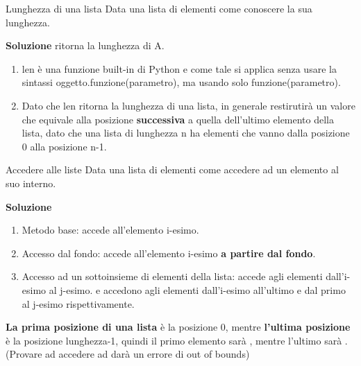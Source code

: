 \documentclass[10pt]{article}
\makeatletter
\newcommand{\<}{\langle}
\renewcommand{\>}{\rangle}
\renewenvironment{proof}[1][\proofname] {\par\pushQED{\qed}
\renewcommand*{\proofname}{Soluzione}
{\normalfont\sffamily\bfseries\topsep6\p@\@plus6\p@\relax #1\@addpunct{.} }}{\popQED\endtrivlist\@endpefalse}
\theoremstyle{mystyle}{\newtheorem*{remark}{Nota}}
\theoremstyle{mystyle}{\newtheorem*{remarks}{Note}}
\theoremstyle{mystyle}{\newtheorem*{example}{Esempio}}
\theoremstyle{mystyle}{\newtheorem*{examples}{Esempi}}
\theoremstyle{definition}{\newtheorem*{exercise}{Exercise}}
\theoremstyle{warn}
\makeatother
\begin{document}
\begin{definition}{Lunghezza di una lista}{}
Data una lista di elementi  come conoscere la sua lunghezza.
\end{definition}
\begin{proof}
 ritorna la lunghezza di A.
\end{proof}
\begin{remarks} \leavevmode
\begin{enumerate}
    \item len è una funzione built-in di Python e come tale si applica senza usare la sintassi oggetto.funzione(parametro), ma usando solo funzione(parametro).
    \item Dato che len ritorna la lunghezza di una lista, in generale restirutirà un valore che equivale alla posizione \textbf{successiva} a quella dell'ultimo elemento della lista, dato che una lista di lunghezza n ha elementi che vanno dalla posizione 0 alla posizione n-1.
\end{enumerate}
\end{remarks}

\begin{definition}{Accedere alle liste}{}
Data una lista di elementi  come accedere ad un elemento al suo interno.
\end{definition}
\begin{proof}
\begin{enumerate}
    \item Metodo base:  accede all'elemento i-esimo.
    \item Accesso dal fondo:  accede all'elemento i-esimo \textbf{a partire dal fondo}.
    \item Accesso ad un sottoinsieme di elementi della lista:   accede agli elementi dall'i-esimo al j-esimo.  e  accedono agli elementi dall'i-esimo all'ultimo e dal primo al j-esimo rispettivamente.
\end{enumerate}
\end{proof}
\begin{remark}
\textbf{La prima posizione di una lista} è la posizione 0, mentre \textbf{l'ultima posizione} è la posizione lunghezza-1, quindi il primo elemento sarà , mentre l'ultimo sarà . (Provare ad accedere ad  darà un errore di out of bounds)
\end{remark}
\end{document}
